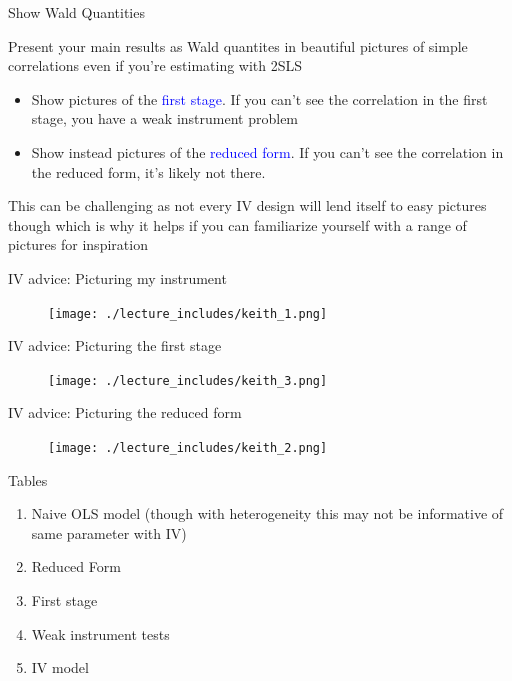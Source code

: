 \documentclass{beamer}
\begin{document}
\begin{frame}{Show Wald Quantities}

Present your main results as Wald quantites in beautiful pictures of simple correlations even if you're estimating with 2SLS
	\begin{itemize}
	\item Show pictures of the \textcolor{blue}{first stage}. If you can't see the correlation in the first stage, you have a weak instrument problem
	\item Show instead pictures of the \textcolor{blue}{reduced form}.  If you can't see the correlation in the reduced form, it's likely not there.
	\end{itemize}
	
	\bigskip
	
This can be challenging as not every IV design will lend itself to easy pictures though which is why it helps if you can familiarize yourself with a range of pictures for inspiration	

\end{frame}



\begin{frame}{IV advice: Picturing my instrument}
	
	\begin{figure}
	\texttt{[image: ./lecture\_includes/keith\_1.png]}
	\end{figure}
	
\end{frame}


\begin{frame}{IV advice: Picturing the first stage}
	
	\begin{figure}
	\texttt{[image: ./lecture\_includes/keith\_3.png]}
	\end{figure}
	
\end{frame}

\begin{frame}{IV advice: Picturing the reduced form}
	
	\begin{figure}
	\texttt{[image: ./lecture\_includes/keith\_2.png]}
	\end{figure}
	
\end{frame}

\begin{frame}{Tables}

\begin{enumerate}
\item Naive OLS model (though with heterogeneity this may not be informative of same parameter with IV)
\item Reduced Form
\item First stage
\item Weak instrument tests
\item IV model
\end{enumerate}

\end{frame}
\end{document}
